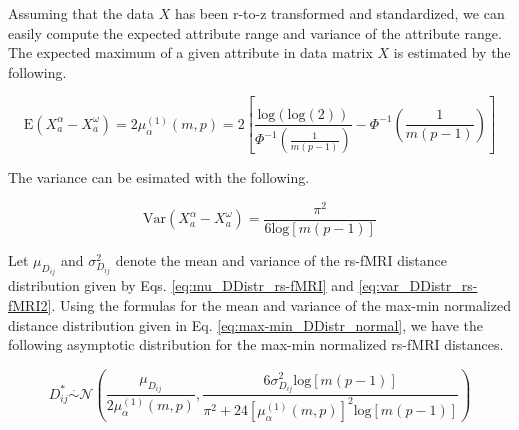 \documentclass[10pt,letterpaper]{article}\usepackage[]{graphicx}\usepackage[]{color}
\begin{document}
Assuming that the data $X$ has been r-to-z transformed and standardized, we can easily compute the expected attribute range and variance of the attribute range. The expected maximum of a given attribute in data matrix $X$ is estimated by the following.

\begin{equation}\label{eq:mean_max_rs-fMRI}
\text{E}\left(X^\alpha_a - X^\omega_a\right) = 2\mu^{(1)}_\alpha(m,p) = 2 \left[\frac{\text{log}(\text{log}(2))}{\Phi^{-1}\left(\frac{1}{m(p-1)}\right)} - \Phi^{-1}\left(\frac{1}{m(p-1)}\right)\right]
\end{equation}

The variance can be esimated with the following.

\begin{equation}\label{eq:var_max_rs-fMRI}
\text{Var}\left(X^\alpha_a - X^\omega_a\right) = \frac{\pi^2}{6\text{log}[m(p-1)]}
\end{equation}

Let $\mu_{D_{ij}}$ and $\sigma^2_{D_{ij}}$ denote the mean and variance of the rs-fMRI distance distribution given by Eqs. \ref{eq:mu_DDistr_rs-fMRI} and \ref{eq:var_DDistr_rs-fMRI2}. Using the formulas for the mean and variance of the max-min normalized distance distribution given in Eq. \ref{eq:max-min_DDistr_normal}, we have the following asymptotic distribution for the max-min normalized rs-fMRI distances.

\begin{equation}\label{eq:max-min_DDistr_normal_rs-fMRI}
D^*_{ij} \overset{.}{\sim} \mathcal{N}\left(\frac{\mu_{D_{ij}}}{2\mu^{(1)}_\alpha(m,p)}, \frac{6\sigma^2_{D_{ij}}\text{log}[m(p-1)]}{\pi^2 + 24\left[\mu^{(1)}_\alpha(m,p)\right]^2\text{log}[m(p-1)]}\right)
\end{equation}

\end{document}

